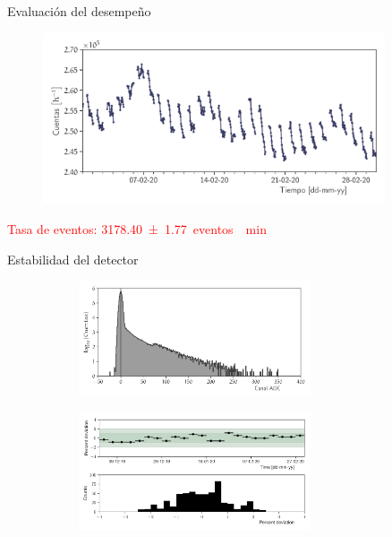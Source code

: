 \documentclass[spanish,aspectratio=169]{beamer}
\begin{document}
\begin{frame}{Evaluación del desempeño}

\begin{figure}
        \centering
        \includegraphics[width=0.9\textwidth]{neutron-monthly.pdf}
\end{figure}

\textcolor{red}{Tasa de eventos: \SI{3178.40(177)}{eventos \per\minute}}

\end{frame}

\begin{frame}{Estabilidad del detector}

\begin{figure}
        \centering
        \begin{subfigure}[b]{0.49\textwidth}
                \includegraphics[width=6.85cm]{neutron-ped.pdf}
        \end{subfigure}
        \begin{subfigure}[b]{0.49\textwidth}
                \includegraphics[width=6.85cm]{neutron-mip_stability.pdf}
        \end{subfigure}
\end{figure}

\end{frame}
\end{document}
